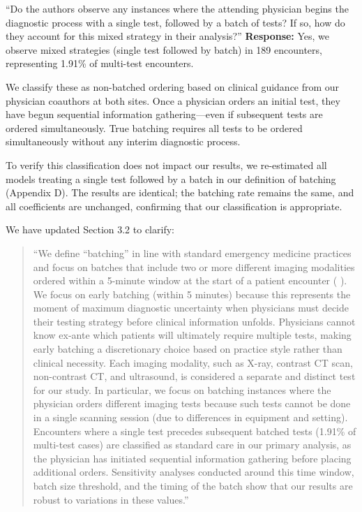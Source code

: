 \documentclass[11pt]{article}
\newenvironment{quote2}
{ \bigskip
\noindent
         \small\em
         \baselineskip=14pt
}
\newcommand{\1}{\hbox{\rm 1\kern-.35em 1}}
\begin{document}
\color{black}

 \begin{quote2}
``Do the authors observe any instances where the attending physician begins the diagnostic process with a single test, followed by a batch of tests? If so, how do they account for this mixed strategy in their analysis?''
\end{quote2}

\noindent\textbf{Response:} \color{blue} Yes, we observe mixed strategies (single test followed by batch) in 189 encounters, representing 1.91\% of multi-test encounters.

We classify these as non-batched ordering based on clinical guidance from our physician coauthors at both sites. Once a physician orders an initial test, they have begun sequential information gathering---even if subsequent tests are ordered simultaneously. True batching requires all tests to be ordered simultaneously without any interim diagnostic process.

To verify this classification does not impact our results, we re-estimated all models treating a single test followed by a batch in our definition of batching (Appendix D). The results are identical; the batching rate remains the same, and all coefficients are unchanged, confirming that our classification is appropriate.

We have updated Section 3.2 to clarify: 

\begin{quote}
    ``We define ``batching'' in line with standard emergency medicine practices and focus on batches that include two or more different imaging modalities ordered within a 5-minute window at the start of a patient encounter (\cite{su2025crisis} \cite{jameson2024variation}). We focus on early batching (within 5 minutes) because this represents the moment of maximum diagnostic uncertainty when physicians must decide their testing strategy before clinical information unfolds. Physicians cannot know ex-ante which patients will ultimately require multiple tests, making early batching a discretionary choice based on practice style rather than clinical necessity. Each imaging modality, such as X-ray, contrast CT scan, non-contrast CT, and ultrasound, is considered a separate and distinct test for our study. In particular, we focus on batching instances where the physician orders different imaging tests because such tests cannot be done in a single scanning session (due to differences in equipment and setting). Encounters where a single test precedes subsequent batched tests (1.91\% of multi-test cases) are classified as standard care in our primary analysis, as the physician has initiated sequential information gathering before placing additional orders. Sensitivity analyses conducted around this time window, batch size threshold, and the timing of the batch show that our results are robust to variations in these values.''
\end{quote}

\color{black}

\newpage



\end{document}
